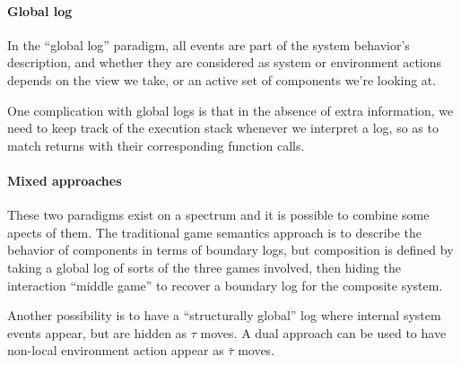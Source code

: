 \documentclass[11pt]{article}
\begin{document}
\paragraph{Global log}

In the ``global log'' paradigm,
all events are part of the system behavior's description,
and whether they are considered as system or environment actions
depends on the view we take,
or an active set of components we're looking at.

One complication with global logs is that
in the absence of extra information,
we need to keep track of the execution stack whenever
we interpret a log,
so as to match returns with their corresponding function calls.


\paragraph{Mixed approaches}

These two paradigms exist on a spectrum and
it is possible to combine some apects of them.
The traditional game semantics approach
is to describe the behavior of components in terms of boundary logs,
but composition is defined by taking a global log of sorts
of the three games involved,
then hiding the interaction ``middle game''
to recover a boundary log for the composite system.

Another possibility is to have a ``structurally global'' log
where internal system events appear, but are hidden as $\tau$ moves.
A dual approach can be used to have
non-local environment action appear as $\bar{\tau}$ moves.


\end{document}
